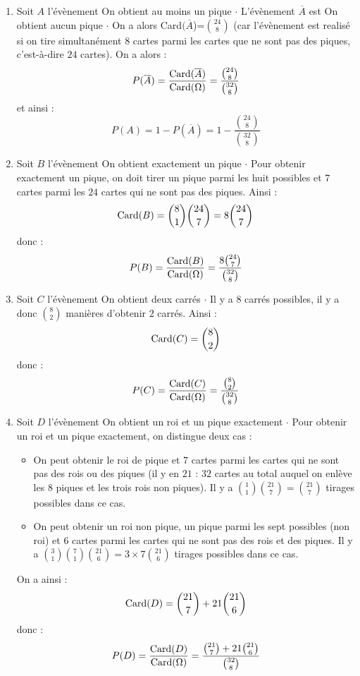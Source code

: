 \documentclass[a4paper,twoside,french,10pt]{VcCours}
\begin{document}
\begin{enumerate}
\item Soit $A$ l'évènement \og On obtient au moins un pique \fg$\cdot$ L'évènement $\overline{A}$ est \og On obtient aucun pique \fg $\cdot$ On a alors Card$(\overline{A}$)=$\binom{24}{8}$ (car l'évènement est realisé si on tire simultanément $8$ cartes parmi les cartes que ne sont pas des piques, c'est-à-dire $24$ cartes). On a alors :
\[ P(\overline{A}) = \frac{\hbox{Card}(\overline{A})}{\hbox{Card}(\Omega)} = \frac{\binom{24}{8}}{\binom{32}{8}}\]
et ainsi :
\[ P(A) = 1 - P(\overline{A}) = 1 - \frac{\binom{24}{8}}{\binom{32}{8}}  \]

\item Soit $B$ l'évènement \og On obtient exactement un pique \fg$\cdot$ Pour obtenir exactement un pique, on doit tirer un pique parmi les huit possibles et $7$ cartes parmi les $24$ cartes qui ne sont pas des piques. Ainsi :
\[ \hbox{Card}(B) = \binom{8}{1} \binom{24}{7} = 8 \binom{24}{7} \]
donc :
\[ P(B) = \frac{\hbox{Card}(B)}{\hbox{Card}(\Omega)} = \frac{8\binom{24}{7}}{\binom{32}{8}} \]

\item Soit $C$ l'évènement \og On obtient deux carrés \fg$\cdot$ Il y a $8$ carrés possibles, il y a donc $\binom{8}{2}$ manières d'obtenir $2$ carrés. Ainsi :
\[ \hbox{Card}(C) = \binom{8}{2} \]
donc :
\[ P(C)= \frac{\hbox{Card}(C)}{\hbox{Card}(\Omega)} = \frac{\binom{8}{2}}{\binom{32}{8}}\]

\item Soit $D$ l'évènement \og On obtient un roi et un pique exactement \fg$\cdot$ Pour obtenir un roi et un pique exactement, on distingue deux cas :
\begin{itemize}
\item On peut obtenir le roi de pique et $7$ cartes parmi les cartes qui ne sont pas des rois ou des piques (il y en $21$ : $32$ cartes au total auquel on enlève les $8$ piques et les trois rois non piques). Il y a $\binom{1}{1}\binom{21}{7}=\binom{21}{7}$ tirages possibles dans ce cas.
\item On peut obtenir un roi non pique, un pique parmi les sept possibles (non roi) et $6$ cartes parmi les cartes qui ne sont pas des rois et des piques. Il y a $\binom{3}{1} \binom{7}{1} \binom{21}{6}= 3 \times 7  \binom{21}{6}$ tirages possibles dans ce cas.
\end{itemize}
On a ainsi :
\[ \hbox{Card}(D) = \binom{21}{7} + 21 \binom{21}{6}\]
donc :
\[  P(D)= \frac{\hbox{Card}(D)}{\hbox{Card}(\Omega)} = \frac{\binom{21}{7} + 21 \binom{21}{6}}{\binom{32}{8}}\]
\end{enumerate}
\end{document}
